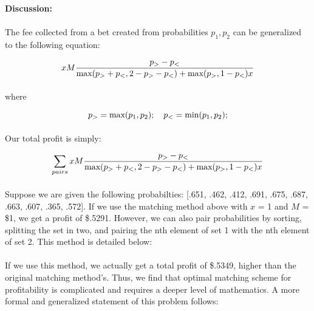 \documentclass[12pt,letterpaper]{article}
\begin{document}
\begin{tcolorbox}
{\bf Discussion:}
\vspace{-15pt}

\paragraph{} The fee collected from a bet created from probabilities $p_1, p_2$ can be generalized to the following equation:

\begin{equation}
x M\frac{p_> - p_<}{\textnormal{max}(p_> + p_<,2 - p_> - p_<) + \textnormal{max}(p_>,1-p_<)x}
\end{equation}

\paragraph{} where

\begin{equation}
p_> = \textnormal{max}(p_1, p_2);   \hspace{10pt}   p_< = \textnormal{min}(p_1, p_2); 
\end{equation}

\paragraph{} Our total profit is simply:

\begin{equation}
\sum_{pairs} x M\frac{p_> - p_<}{\textnormal{max}(p_> + p_<,2 - p_> - p_<) + \textnormal{max}(p_>,1-p_<)x}
\end{equation}

\paragraph{} Suppose we are given the following probabilties: [.651, .462, .412, .691, .675, .687, .663, .607, .365, .572]. If we use the matching method above with $x$ = 1 and $M$ = \$1, we get a profit of \$.5291. However, we can also pair probabilities by sorting, splitting the set in two, and pairing the nth element of set 1 with the nth element of set 2.  This method is detailed below:

\paragraph{} If we use this method, we actually get a total profit of \$.5349, higher than the original matching method's. Thus, we find that optimal matching scheme for profitability is complicated and requires a deeper level of mathematics. A more formal and generalized statement of this problem follows:


\end{tcolorbox}
\end{document}
